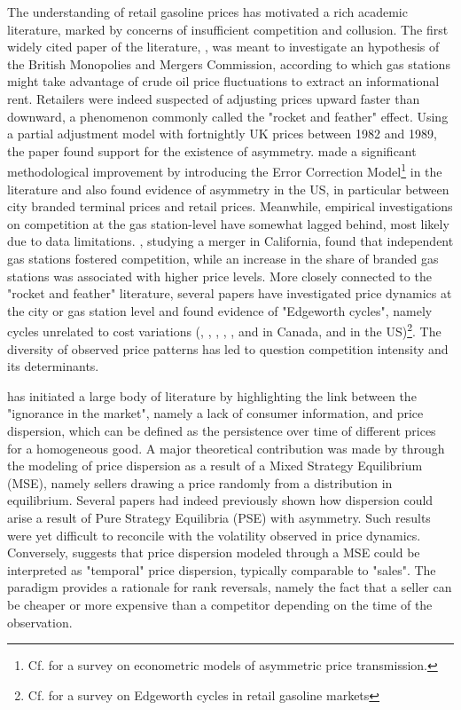 \documentclass[english]{article}
\begin{document}
The understanding of retail gasoline prices has motivated a rich academic literature, marked by concerns of insufficient competition and collusion. The first widely cited paper of the literature, \cite{BAC91}, was meant to investigate an hypothesis of the British Monopolies and Mergers Commission, according to which gas stations might take advantage of crude oil price fluctuations to extract an informational rent. Retailers were indeed suspected of adjusting prices upward faster than downward, a phenomenon commonly called the "rocket and feather" effect. Using a partial adjustment model with fortnightly UK prices between 1982 and 1989, the paper found support for the existence of asymmetry. \cite{BOR97} made a significant methodological improvement by introducing the Error Correction Model\footnote{Cf. \cite{FRE07} for a survey on econometric models of asymmetric price transmission.} in the literature and also found evidence of asymmetry in the US, in particular between city branded terminal prices and retail prices. Meanwhile, empirical investigations on competition at the gas station-level have somewhat lagged behind, most likely due to data limitations. \cite{HAS04}, studying a merger in California, found that independent gas stations fostered competition, while an increase in the share of branded gas stations was associated with higher price levels. More closely connected to the "rocket and feather" literature, several papers have investigated price dynamics at the city or gas station level and found evidence of "Edgeworth cycles", namely cycles unrelated to cost variations (\cite{ECK02}, \cite{ECK03}, \cite{ECK04a}, \cite{ECK04b}, \cite{NOE07a}, \cite{NOE07b} and \cite{NOE08} in Canada, \cite{LEW09} and \cite{LEW11a} in the US)\footnote{Cf. \cite{ECK13} for a survey on Edgeworth cycles in retail gasoline markets}. The diversity of observed price patterns has led to question competition intensity and its determinants.

\cite{STI61} has initiated a large body of literature by highlighting the link between the "ignorance in the market", namely a lack of consumer information, and price dispersion, which can be defined as the persistence over time of different prices for a homogeneous good. A major theoretical contribution was made by \cite{VAR80} through the modeling of price dispersion as a result of a Mixed Strategy Equilibrium (MSE), namely sellers drawing a price randomly from a distribution in equilibrium. Several papers had indeed previously shown how dispersion could arise a result of Pure Strategy Equilibria (PSE) with asymmetry. Such results were yet difficult to reconcile with the volatility observed in price dynamics. Conversely, \cite{VAR80} suggests that price dispersion modeled through a MSE could be interpreted as "temporal" price dispersion, typically comparable to "sales". The \cite{VAR80} paradigm provides a rationale for rank reversals, namely the fact that a seller can be cheaper or more expensive than a competitor depending on the time of the observation.
\end{document}
